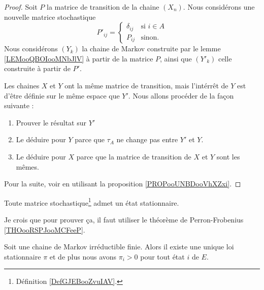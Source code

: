 \begin{proof}
    Soit \( P\) la matrice de transition de la chaine \( (X_n)\). Nous considérons une nouvelle matrice stochastique
    \begin{equation}
        P'_{ij}=\begin{cases}
            \delta_{ij}    &   \text{si } i\in A\\
            P_{ij}    &    \text{sinon. }
        \end{cases}
    \end{equation}
    Nous considérons \( (Y_k)\) la chaine de Markov construite par le lemme \ref{LEMooQBOIooMNbJlV} à partir de la matrice \( P\), ainsi que \( (Y'_k)\) celle construite à partir de \( P'\).

    Les chaines \( X\) et \( Y\) ont la même matrice de transition, mais l'intérrêt de \( Y\) est d'être définie sur le même espace que \( Y'\). Nous allons procéder de la façon suivante :
    \begin{enumerate}
        \item
            Prouver le résultat sur \( Y'\)
        \item
            Le déduire pour \( Y\) parce que \( \tau_A\) ne change pas entre \( Y'\) et \( Y\).
        \item
            Le déduire pour \( X\) parce que la matrice de transition de \( X\) et \( Y\) sont les mêmes.
    \end{enumerate}

    Pour la suite, voir \cite{GMbugcT} en utilisant la proposition \ref{PROPooUNBDooVhXZxi}.
\end{proof}



\begin{proposition} \label{PropOJumFwe}
    Toute matrice stochastique\footnote{Définition \ref{DefGJEBooZvuIAV}.} admet un état stationnaire.
\end{proposition}
Je crois que pour prouver ça, il faut utiliser le théorème de Perron-Frobenius \ref{THOooRSPJooMCFeeP}.

\begin{proposition}     \label{PropUMPpOHW}
	Soit une chaine de Markov irréductible finie. Alors il existe une unique loi stationnaire \( \pi\) et de plus nous avons \( \pi_i>0\) pour tout état \( i\) de \( E\).
\end{proposition}


